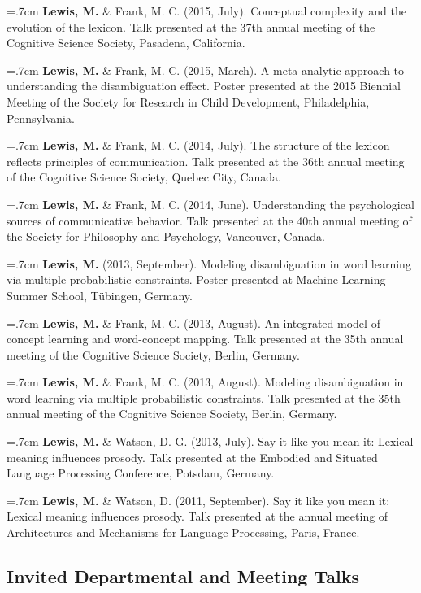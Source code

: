 \documentclass[letterpaper]{article}
\begin{document}
\hangindent=.7cm {\bf Lewis, M.} \& Frank, M. C. (2015, July). Conceptual complexity and the evolution of the lexicon. Talk presented at the 37th annual meeting of the Cognitive Science Society, Pasadena, California.

\hangindent=.7cm {\bf Lewis, M.} \& Frank, M. C. (2015, March). A meta-analytic approach to understanding the disambiguation effect. Poster presented at  the 2015 Biennial Meeting of the Society for Research in Child Development, Philadelphia, Pennsylvania.


\hangindent=.7cm {\bf Lewis, M.} \& Frank, M. C. (2014, July). The structure of the lexicon reflects  principles of communication. Talk presented at the 36th annual meeting of the Cognitive Science Society, Quebec City, Canada.

\hangindent=.7cm {\bf Lewis, M.} \& Frank, M. C. (2014, June). Understanding the psychological sources of communicative behavior. Talk presented at the 40th annual meeting of the Society for Philosophy and Psychology, Vancouver, Canada.

 \hangindent=.7cm {\bf Lewis, M.} (2013, September). Modeling disambiguation in word learning via multiple probabilistic constraints. Poster presented at Machine Learning Summer School, T\"{u}bingen, Germany.
 

 \hangindent=.7cm {\bf Lewis, M.}  \& Frank, M. C. (2013, August). An integrated model of concept learning and word-concept mapping. Talk presented at the 35th annual meeting of the Cognitive Science Society, Berlin, Germany.
 
 \hangindent=.7cm {\bf Lewis, M.}  \& Frank, M. C.  (2013, August). Modeling disambiguation in word learning via multiple probabilistic constraints. Talk presented at the 35th annual meeting of the Cognitive Science Society, Berlin, Germany.
 
  \hangindent=.7cm {\bf Lewis, M.} \& Watson, D. G.  (2013, July). Say it like you mean it: Lexical meaning influences prosody. Talk presented at the Embodied and Situated Language Processing Conference, Potsdam, Germany.
 

 \hangindent=.7cm {\bf Lewis, M.}  \& Watson, D. (2011, September). Say it like you mean it: Lexical meaning influences prosody. Talk presented at the annual meeting of Architectures and Mechanisms for Language Processing, Paris, France.
 

\subsection*{Invited Departmental and Meeting Talks}
\end{document}
